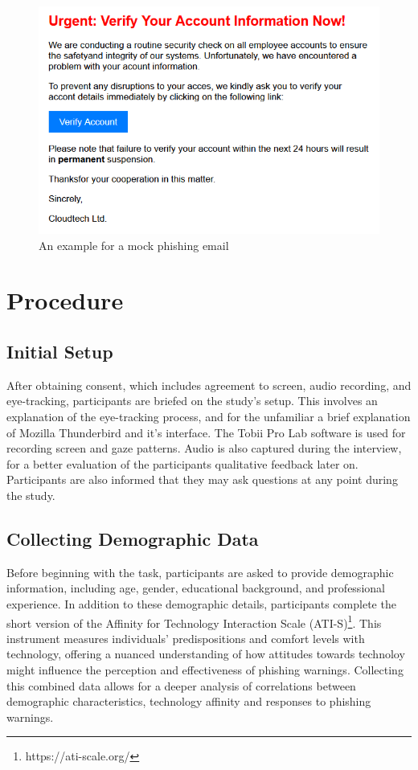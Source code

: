\documentclass[
  a4paper,  %
  twoside,  %
  bibliography=totoc,
  headsepline,
  cleardoublepage=empty,
  parskip=half,
  draft=false
]{scrbook}
\begin{document}
\begin{figure} [ht]
    \centering
    \includegraphics[width=0.7\linewidth]{figures/example.png}
    \caption{An example for a mock phishing email}
    \label{fig:example}
\end{figure}



\section{Procedure}

\subsection{Initial Setup}

After obtaining consent, which includes agreement to screen, audio recording, and eye-tracking, participants are briefed on the study's setup. This involves an explanation of the eye-tracking process, and for the unfamiliar a brief explanation of Mozilla Thunderbird and it's interface. The Tobii Pro Lab software is used for recording screen and gaze patterns. Audio is also captured during the interview, for a better evaluation of the participants qualitative feedback later on. Participants are also informed that they may ask questions at any point during the study. 

\subsection{Collecting Demographic Data}

Before beginning with the task, participants are asked to provide demographic information, including age, gender, educational background, and professional experience. In addition to these demographic details, participants complete the short version of the Affinity for Technology Interaction Scale (ATI-S)\footnote{https://ati-scale.org/}. This instrument measures individuals' predispositions and comfort levels with technology, offering a nuanced understanding of how attitudes towards technoloy might influence the perception and effectiveness of phishing warnings. Collecting this combined data allows for a deeper analysis of correlations between demographic characteristics, technology affinity and responses to phishing warnings.
\end{document}
